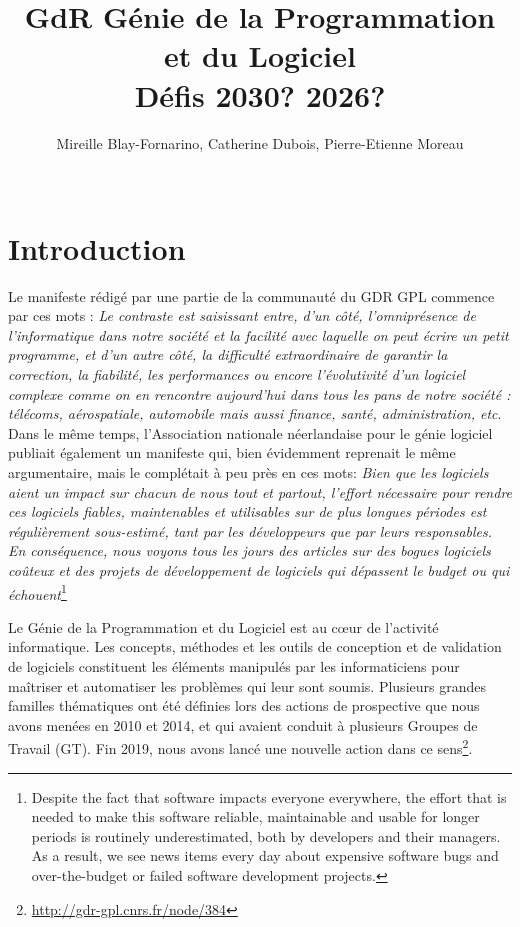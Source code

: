 \documentclass[11pt]{article}
\title{GdR Génie de la Programmation et du Logiciel\\ 
Défis 2030? 2026?}
\author{Mireille Blay-Fornarino, Catherine Dubois, Pierre-Etienne Moreau\\
\\
}
\begin{document}
\maketitle

\section{Introduction}

Le manifeste rédigé par une partie de la communauté du GDR GPL commence par ces mots : \emph{Le contraste est saisissant entre, d’un côté, l’omniprésence de l’informatique dans notre
société et la facilité avec laquelle on peut écrire un petit programme, et d’un autre côté, la difficulté extraordinaire de garantir la correction, la fiabilité, les performances ou encore
l’évolutivité d’un logiciel complexe comme on en rencontre aujourd’hui dans tous les pans
de notre société : télécoms, aérospatiale, automobile mais aussi finance, santé,
administration, etc}\cite{Manifeste}.
Dans le même temps, l'Association nationale néerlandaise pour le génie logiciel publiait également un manifeste \cite{Nederland2019} qui, bien évidemment reprenait le même argumentaire, mais le complétait à peu près en ces mots:  \emph{Bien que les logiciels aient un impact sur chacun de nous tout et partout, l'effort nécessaire pour rendre ces logiciels fiables, maintenables et utilisables sur de plus longues périodes est régulièrement sous-estimé, tant par les développeurs que par leurs responsables. En conséquence, nous voyons tous les jours des articles sur des bogues logiciels coûteux et des projets de développement de logiciels qui dépassent le budget ou qui échouent}\footnote{Despite the fact that software impacts everyone everywhere, the effort that is needed to make this software reliable,
maintainable and usable for longer periods is routinely underestimated, both by developers and their managers. As a result,
we see news items every day about expensive software bugs and over-the-budget or failed software development projects\cite{Nederland2019}.}





Le Génie de la Programmation et du Logiciel est au c{\oe}ur de l'activité
informatique. Les concepts, méthodes et les outils de conception et de
validation de logiciels constituent les éléments manipulés par les
informaticiens pour maîtriser et automatiser les problèmes qui leur sont
soumis. 
Plusieurs grandes familles thématiques ont été définies lors des actions de prospective que nous avons menées en 2010 et 2014, et qui avaient conduit à plusieurs Groupes de Travail (GT). 
Fin 2019, nous avons lancé une nouvelle action dans ce sens\footnote{\url{http://gdr-gpl.cnrs.fr/node/384}}. %
\end{document}
